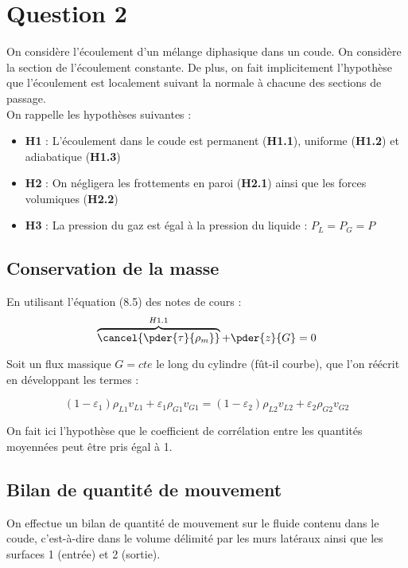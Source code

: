 \section{Question 2\label{section:ex2}}

On considère l'écoulement d'un mélange diphasique dans un coude. On considère la section de l'écoulement constante. De plus, on fait implicitement l'hypothèse que l'écoulement est localement suivant la normale à chacune des sections de passage.\\

On rappelle les hypothèses suivantes :
\begin{itemize}
    \item \textbf{H1} : L'écoulement dans le coude est permanent (\textbf{H1.1}), uniforme (\textbf{H1.2}) et adiabatique (\textbf{H1.3})
    \item \textbf{H2} : On négligera les frottements en paroi (\textbf{H2.1}) ainsi que les forces volumiques (\textbf{H2.2})
     \item \textbf{H3} : La pression du gaz est égal à la pression du liquide : $P_L = P_G = P$
\end{itemize}

\subsection{Conservation de la masse}

En utilisant l'équation (8.5) des notes de cours :
\begin{equation}
    \overbrace{\cancel{\pder{\tau}{\rho_m}}}^{H1.1} + \pder{z}{G} = 0
\end{equation}

Soit un flux massique $G=cte$ le long du cylindre (fût-il courbe), que l'on réécrit en développant les termes :

\begin{equation}
    (1-\varepsilon_1)\rho_{L1}v_{L1} + \varepsilon_1 \rho_{G1}v_{G1} = (1-\varepsilon_2)\rho_{L2}v_{L2} + \varepsilon_2 \rho_{G2}v_{G2}
\end{equation}

On fait ici l'hypothèse que le coefficient de corrélation entre les quantités moyennées peut être pris égal à 1.

\subsection{Bilan de quantité de mouvement}

On effectue un bilan de quantité de mouvement sur le fluide contenu dans le coude, c'est-à-dire dans le volume délimité par les murs latéraux ainsi que les surfaces 1 (entrée) et 2 (sortie). \\

